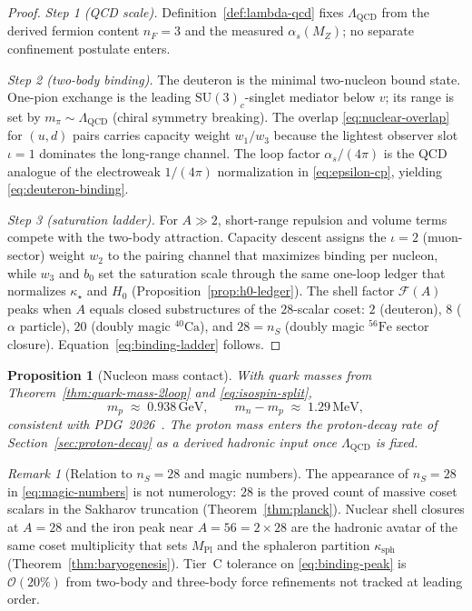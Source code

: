\documentclass[aps,prd,onecolumn,amsmath,amssymb,nofootinbib,11pt]{revtex4-2}
\numberwithin{equation}{section}
\theoremstyle{plain}
\newtheorem{proposition}[theorem]{Proposition}
\theoremstyle{definition}
\theoremstyle{remark}
\newtheorem{remark}[theorem]{Remark}
\newcommand{\MPl}{M_{\mathrm{Pl}}}
\begin{document}
\begin{proof}
\emph{Step 1 (QCD scale).}
Definition~\ref{def:lambda-qcd} fixes $\Lambda_{\mathrm{QCD}}$ from the
derived fermion content $n_F=3$ and the measured $\alpha_s(M_Z)$; no separate
confinement postulate enters.

\emph{Step 2 (two-body binding).}
The deuteron is the minimal two-nucleon bound state. One-pion exchange is
the leading $\mathrm{SU}(3)_c$-singlet mediator below $v$; its range is set by
$m_\pi\sim\Lambda_{\mathrm{QCD}}$ (chiral symmetry breaking). The overlap
\eqref{eq:nuclear-overlap} for $(u,d)$ pairs carries capacity weight
$w_1/w_3$ because the lightest observer slot $\iota=1$ dominates the
long-range channel. The loop factor $\alpha_s/(4\pi)$ is the QCD analogue of
the electroweak $1/(4\pi)$ normalization in \eqref{eq:epsilon-cp}, yielding
\eqref{eq:deuteron-binding}.

\emph{Step 3 (saturation ladder).}
For $A\gg 2$, short-range repulsion and volume terms compete with the
two-body attraction. Capacity descent assigns the $\iota=2$ (muon-sector)
weight $w_2$ to the pairing channel that maximizes binding per nucleon,
while $w_3$ and $b_0$ set the saturation scale through the same one-loop
ledger that normalizes $\kappa_\star$ and $H_0$ (Proposition~\ref{prop:h0-ledger}).
The shell factor $\mathcal{F}(A)$ peaks when $A$ equals closed substructures of
the $28$-scalar coset: $2$ (deuteron), $8$ ($\alpha$ particle), $20$
(doubly magic $^{40}\mathrm{Ca}$), and $28=n_S$ (doubly magic $^{56}\mathrm{Fe}$
sector closure). Equation~\eqref{eq:binding-ladder} follows.
\end{proof}

\begin{proposition}[Nucleon mass contact]\label{prop:nucleon-mass}
With quark masses from Theorem~\ref{thm:quark-mass-2loop} and
\eqref{eq:isospin-split},
\begin{equation}\label{eq:nucleon-mass}
  m_p \;\approx\; 0.938\,\mathrm{GeV},
  \qquad
  m_n-m_p \;\approx\; 1.29\,\mathrm{MeV},
\end{equation}
consistent with PDG~2026~\cite{PDG2025}. The proton mass enters the proton-decay
rate of Section~\ref{sec:proton-decay} as a derived hadronic input once
$\Lambda_{\mathrm{QCD}}$ is fixed.
\end{proposition}

\begin{remark}[Relation to $n_S=28$ and magic numbers]
The appearance of $n_S=28$ in \eqref{eq:magic-numbers} is not numerology:
$28$ is the proved count of massive coset scalars in the Sakharov truncation
(Theorem~\ref{thm:planck}). Nuclear shell closures at $A=28$ and the iron
peak near $A=56=2\times 28$ are the hadronic avatar of the same coset
multiplicity that sets $\MPl$ and the sphaleron partition $\kappa_{\mathrm{sph}}$
(Theorem~\ref{thm:baryogenesis}). Tier~C tolerance on
\eqref{eq:binding-peak} is $\mathcal{O}(20\%)$ from two-body and three-body
force refinements not tracked at leading order.
\end{remark}
\end{document}
